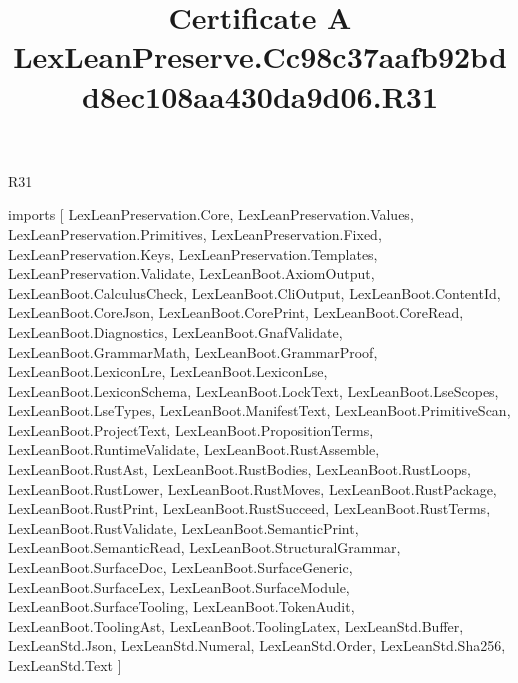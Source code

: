 \begin{lexlean}{R31}
\title{Certificate A LexLeanPreserve.Cc98c37aafb92bdd8ec108aa430da9d06.R31}
\begin{coremodule}
imports [
  LexLeanPreservation.Core,
  LexLeanPreservation.Values,
  LexLeanPreservation.Primitives,
  LexLeanPreservation.Fixed,
  LexLeanPreservation.Keys,
  LexLeanPreservation.Templates,
  LexLeanPreservation.Validate,
  LexLeanBoot.AxiomOutput,
  LexLeanBoot.CalculusCheck,
  LexLeanBoot.CliOutput,
  LexLeanBoot.ContentId,
  LexLeanBoot.CoreJson,
  LexLeanBoot.CorePrint,
  LexLeanBoot.CoreRead,
  LexLeanBoot.Diagnostics,
  LexLeanBoot.GnafValidate,
  LexLeanBoot.GrammarMath,
  LexLeanBoot.GrammarProof,
  LexLeanBoot.LexiconLre,
  LexLeanBoot.LexiconLse,
  LexLeanBoot.LexiconSchema,
  LexLeanBoot.LockText,
  LexLeanBoot.LseScopes,
  LexLeanBoot.LseTypes,
  LexLeanBoot.ManifestText,
  LexLeanBoot.PrimitiveScan,
  LexLeanBoot.ProjectText,
  LexLeanBoot.PropositionTerms,
  LexLeanBoot.RuntimeValidate,
  LexLeanBoot.RustAssemble,
  LexLeanBoot.RustAst,
  LexLeanBoot.RustBodies,
  LexLeanBoot.RustLoops,
  LexLeanBoot.RustLower,
  LexLeanBoot.RustMoves,
  LexLeanBoot.RustPackage,
  LexLeanBoot.RustPrint,
  LexLeanBoot.RustSucceed,
  LexLeanBoot.RustTerms,
  LexLeanBoot.RustValidate,
  LexLeanBoot.SemanticPrint,
  LexLeanBoot.SemanticRead,
  LexLeanBoot.StructuralGrammar,
  LexLeanBoot.SurfaceDoc,
  LexLeanBoot.SurfaceGeneric,
  LexLeanBoot.SurfaceLex,
  LexLeanBoot.SurfaceModule,
  LexLeanBoot.SurfaceTooling,
  LexLeanBoot.TokenAudit,
  LexLeanBoot.ToolingAst,
  LexLeanBoot.ToolingLatex,
  LexLeanStd.Buffer,
  LexLeanStd.Json,
  LexLeanStd.Numeral,
  LexLeanStd.Order,
  LexLeanStd.Sha256,
  LexLeanStd.Text
]


\end{coremodule}
\end{lexlean}
